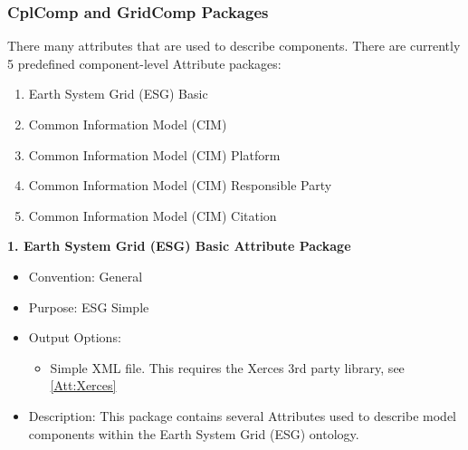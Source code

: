 \subsubsection{CplComp and GridComp Packages}
\label{ComponentAttributePackages}

There many attributes that are used to describe components. There are currently 5 predefined component-level Attribute packages:

\begin{enumerate}
    \item Earth System Grid (ESG) Basic
    \item Common Information Model (CIM) 
    \item Common Information Model (CIM) Platform
    \item Common Information Model (CIM) Responsible Party
    \item Common Information Model (CIM) Citation
\end{enumerate}

\vspace{.25in}

{\bf 1. Earth System Grid (ESG) Basic Attribute Package}

\begin{itemize}
    \item Convention: General
    \item Purpose: ESG Simple
    \item Output Options:
    \begin{itemize}
        \item{Simple XML file. This requires the Xerces 3rd party library, see \ref{Att:Xerces}}
    \end{itemize} 
    \item Description: This package contains several Attributes used to describe model components within the Earth System Grid (ESG) ontology. 
\end{itemize}


